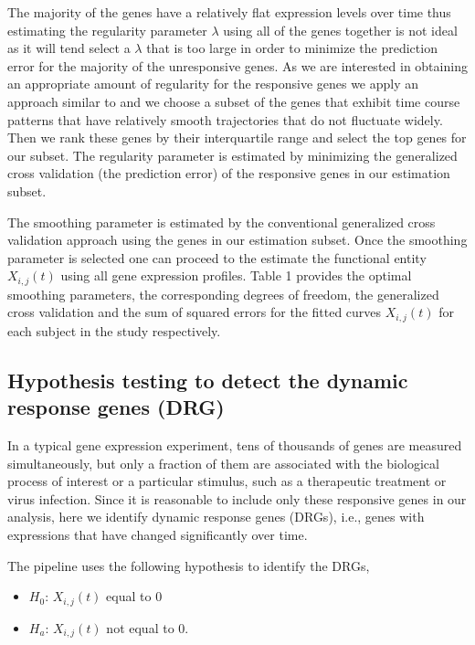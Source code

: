 The majority of the genes have a relatively flat expression levels over time thus estimating the regularity parameter $\lambda$ using all of the genes together is not ideal as it will tend select a $\lambda$ that is too large in order to minimize the prediction error for the majority of the unresponsive genes. As we are interested in obtaining an appropriate amount of regularity for the responsive genes we apply an approach similar to \cite{yao2005functional} and \cite{wu2013more} we choose a subset of the genes that exhibit time course patterns that have relatively smooth trajectories that do not fluctuate widely. Then we rank these genes by their interquartile range and select the top genes for our subset. The regularity parameter is estimated by minimizing the generalized cross validation (the prediction error) of the responsive genes in our estimation subset.

The smoothing parameter is estimated by the conventional generalized cross validation approach using the genes in our estimation subset. Once the smoothing parameter is selected one can proceed to the estimate the functional entity $X_{i,j}(t)$ using all gene expression profiles. Table 1 provides the optimal smoothing parameters, the corresponding degrees of freedom, the generalized cross validation and the sum of squared errors for the fitted curves $X_{i,j}(t)$ for each subject in the study respectively.

\subsection{Hypothesis testing to detect the dynamic response genes (DRG)}

In a typical gene expression experiment, tens of thousands of genes are measured simultaneously, but only a fraction of them are associated with the biological process of interest or a particular stimulus, such as a therapeutic treatment or virus infection. Since it is reasonable to include only these responsive genes in our analysis, here we identify dynamic response genes (DRGs), i.e., genes with expressions that have changed significantly over time.

The pipeline uses the following hypothesis to identify the DRGs,


\begin{itemize}

\item $H_{0}$: $X_{i,j}(t)$ equal to $0$

\item $H_{a}$: $X_{i,j}(t)$ not equal to $0$.

\end{itemize}

